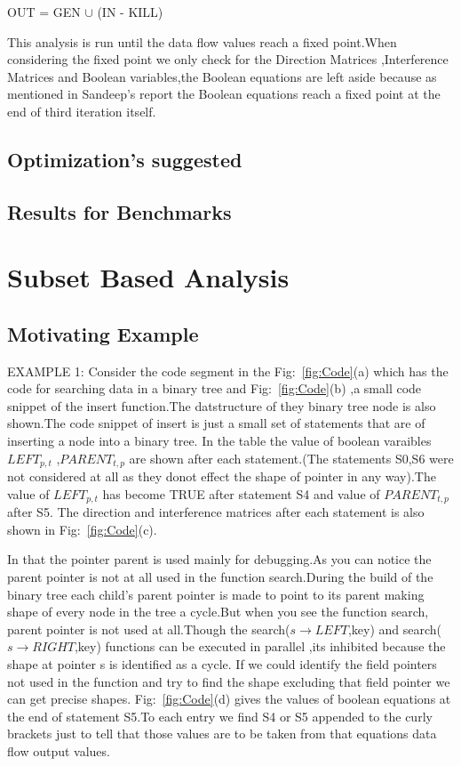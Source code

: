 \documentclass[11pt]{article}
\newcommand{\s}{\ensuremath{s}}
\newcommand{\LEFT}{\ensuremath{LEFT}}
\newcommand{\RIGHT}{\ensuremath{RIGHT}}
\newcommand{\PARENT}{\ensuremath{PARENT}}
\begin{document}
OUT = GEN $\cup$ (IN - KILL) 

  This analysis is run until the data flow values reach a fixed point.When considering the fixed point we only check for
the Direction Matrices ,Interference Matrices and Boolean variables,the Boolean equations are left aside because as
mentioned in Sandeep's report \cite{Sandeep11thesis} the Boolean equations reach a fixed point at the end of 
third iteration itself.
\subsection{Optimization's suggested}
\subsection{Results for Benchmarks}


\section{Subset Based Analysis}
  \subsection{Motivating Example}

EXAMPLE 1:
Consider the code segment in the Fig:~\ref{fig:Code}(a) which has the code  for searching data in a binary tree  and  Fig:~\ref{fig:Code}(b) ,a small code snippet of the
insert function.The datstructure of they binary tree node is also shown.The code snippet of insert is just a small set of statements that are of inserting 
a node into a binary tree. 
  In the table the value of boolean varaibles  $\LEFT_{p,t}$ ,$\PARENT_{t,p}$ are shown after each statement.(The statements S0,S6 were not considered at all
as they donot effect the shape of pointer in any way).The value of $\LEFT_{p,t}$ has become TRUE after statement S4 and value of  $\PARENT_{t,p}$ after S5.
The direction and interference matrices after each statement is also shown in Fig:~\ref{fig:Code}(c).

    In that the pointer parent is used mainly for debugging.As you can notice the parent pointer is not at all used in
the function search.During the build of the binary tree each child's parent pointer is made to point to its parent making shape of
every node in the tree a cycle.But when you see the function search, parent pointer is not used at all.Though the search($\s\rightarrow\LEFT$,key)
and search($\s\rightarrow\RIGHT$,key) functions can be executed in parallel ,its inhibited because the shape at pointer s is identified as a cycle.
If we could identify the field pointers not used in the function and try to find the shape excluding that field pointer we can get
precise shapes. Fig:~\ref{fig:Code}(d) gives the values of boolean equations at the end of statement S5.To each entry we find S4 or S5 appended to the curly brackets just
to tell that those values are to be taken from that equations data flow output values.
\end{document}
